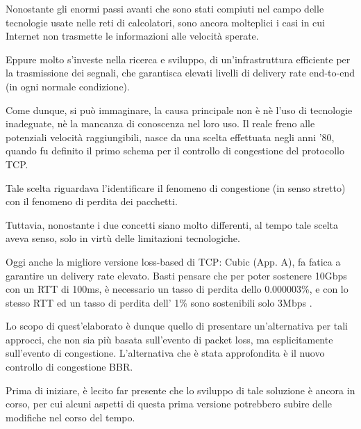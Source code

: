 Nonostante gli enormi passi avanti che sono stati compiuti nel campo delle tecnologie usate nelle reti di calcolatori, sono ancora molteplici i casi in cui Internet non trasmette le informazioni alle velocità sperate. \bigskip

Eppure molto s’investe nella ricerca e sviluppo, di un’infrastruttura efficiente per la trasmissione dei segnali, che garantisca elevati livelli di delivery rate end-to-end (in ogni normale condizione). \bigskip

Come dunque, si può immaginare, la causa principale non è nè l’uso di tecnologie inadeguate, nè la mancanza di conoscenza nel loro uso. Il reale freno alle potenziali velocità raggiungibili, nasce da una scelta effettuata negli anni '80, quando fu definito il primo schema per il controllo di congestione del protocollo TCP. \bigskip

Tale scelta riguardava l’identificare il fenomeno di congestione (in senso stretto) con il fenomeno di perdita dei pacchetti. \bigskip

Tuttavia, nonostante i due concetti siano molto differenti, al tempo tale scelta aveva senso, solo in virtù delle limitazioni tecnologiche. \bigskip

Oggi anche la migliore versione loss-based di TCP: Cubic (App. A), fa fatica a garantire un delivery rate elevato. Basti pensare che per poter sostenere 10Gbps con un RTT di 100ms, è necessario un tasso di perdita dello 0.000003\%, e con lo stesso RTT ed un tasso di perdita dell’ 1\% sono sostenibili solo 3Mbps \cite[p.~12]{ietf:draft-ietf-tcpm-cubic-05}. \bigskip

Lo scopo di quest'elaborato è dunque quello di presentare un'alternativa per tali approcci, che non sia più basata sull'evento di packet loss, ma esplicitamente sull'evento di congestione. L'alternativa che è stata approfondita è il nuovo controllo di congestione BBR. \bigskip

Prima di iniziare, è lecito far presente che lo sviluppo di tale soluzione è ancora in corso, per cui alcuni aspetti di questa prima versione potrebbero subire delle modifiche nel corso del tempo.